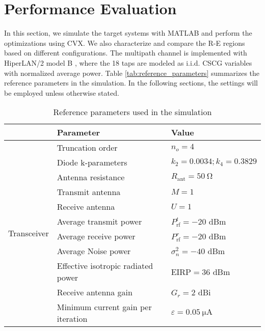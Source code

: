 \chapter{Performance Evaluation}
In this section, we simulate the target systems with MATLAB and perform the optimizations using CVX. We also characterize and compare the R-E regions based on different configurations. The multipath channel is implemented with HiperLAN/2 model B \cite{Medbo1998}, where the 18 taps are modeled as i.i.d. CSCG variables with normalized average power. Table \ref{tab:reference_parameters} summarizes the reference parameters in the simulation. In the following sections, the settings will be employed unless otherwise stated.

\begin{table}[h!]
\caption{Reference parameters used in the simulation}
\begin{tabular}{lll}
                              & Parameter                          & Value                                \\ \hline
\multirow{11}{*}{Transceiver} & Truncation order                   & ${n_o} = 4$                          \\
                              & Diode k-parameters                 & ${k_2} = 0.0034;{k_4} = 0.3829$      \\
                              & Antenna resistance                 & ${R_{{\text{ant}}}} = \SI{50}{\ohm}$ \\
                              & Transmit antenna                   & $M = 1$                              \\
                              & Receive antenna                    & $U = 1$                              \\
                              & Average transmit power             & $P_{{\text{rf}}}^t =  - 20$ dBm      \\
                              & Average receive power              & $P_{{\text{rf}}}^r =  - 20$ dBm      \\
                              & Average Noise power                & $\sigma _n^2 =  - 40$ dBm            \\
                              & Effective isotropic radiated power & $\text{EIRP} = 36$ dBm               \\
                              & Receive antenna gain               & ${G_r} = 2$ dBi                      \\
                              & Minimum current gain per iteration & $\varepsilon  = \SI{0.05}{\uA}$      \\ \hline

\end{tabular}
\end{table}
